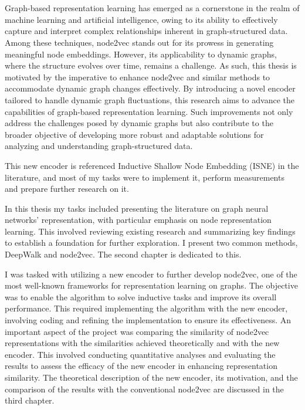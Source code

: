 \chapter{\bevezetes}

Graph-based representation learning has emerged as a cornerstone in the realm of machine learning and artificial intelligence, owing to its ability to effectively capture and interpret complex relationships inherent in graph-structured data. Among these techniques, node2vec stands out for its prowess in generating meaningful node embeddings. However, its applicability to dynamic graphs, where the structure evolves over time, remains a challenge. As such, this thesis is motivated by the imperative to enhance node2vec and similar methods to accommodate dynamic graph changes effectively. By introducing a novel encoder tailored to handle dynamic graph fluctuations, this research aims to advance the capabilities of graph-based representation learning. Such improvements not only address the challenges posed by dynamic graphs but also contribute to the broader objective of developing more robust and adaptable solutions for analyzing and understanding graph-structured data.

This new encoder is referenced Inductive Shallow Node Embedding (ISNE) in the literature, and most of my tasks were to implement it, perform measurements and prepare further research on it.

In this thesis my tasks included presenting the literature on graph neural networks' representation, with particular emphasis on node representation learning. This involved reviewing existing research and summarizing key findings to establish a foundation for further exploration. I present two common methods, DeepWalk and node2vec. The second chapter is dedicated to this.

I was tasked with utilizing a new encoder to further develop node2vec, one of the most well-known frameworks for representation learning on graphs. The objective was to enable the algorithm to solve inductive tasks and improve its overall performance. This required implementing the algorithm with the new encoder, involving coding and refining the implementation to ensure its effectiveness. An important aspect of the project was comparing the similarity of node2vec representations with the similarities achieved theoretically and with the new encoder. This involved conducting quantitative analyses and evaluating the results to assess the efficacy of the new encoder in enhancing representation similarity. The theoretical description of the new encoder, its motivation, and the comparison of the results with the conventional node2vec are discussed in the third chapter.

